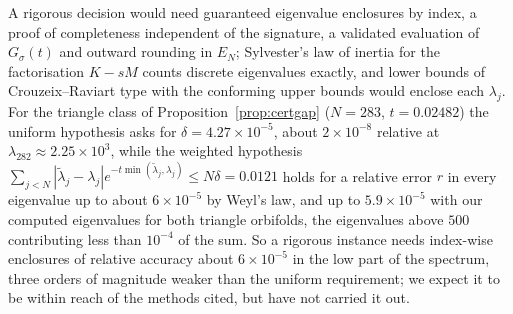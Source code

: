 \documentclass[pdflatex,sn-mathphys-num]{sn-jnl}
\theoremstyle{thmstyleone}%
\theoremstyle{thmstylethree}%
\begin{document}
A rigorous decision would need guaranteed eigenvalue enclosures by index, a proof of completeness independent of the signature, a validated evaluation of $G_\sigma(t)$ and outward rounding in $E_N$; Sylvester's law of inertia for the factorisation $K-sM$ counts discrete eigenvalues exactly, and lower bounds of Crouzeix--Raviart type \cite{liuoishi2013,carstensengedicke2014} with the conforming upper bounds would enclose each $\lambda_j$. For the triangle class of Proposition~\ref{prop:certgap} ($N=283$, $t=0.02482$) the uniform hypothesis asks for $\delta=4.27\times10^{-5}$, about $2\times10^{-8}$ relative at $\lambda_{282}\approx2.25\times10^3$, while the weighted hypothesis $\sum_{j<N}|\tilde\lambda_j-\lambda_j|e^{-t\min(\tilde\lambda_j,\lambda_j)}\le N\delta=0.0121$ holds for a relative error $r$ in every eigenvalue up to about $6\times10^{-5}$ by Weyl's law, and up to $5.9\times10^{-5}$ with our computed eigenvalues for both triangle orbifolds, the eigenvalues above $500$ contributing less than $10^{-4}$ of the sum. So a rigorous instance needs index-wise enclosures of relative accuracy about $6\times10^{-5}$ in the low part of the spectrum, three orders of magnitude weaker than the uniform requirement; we expect it to be within reach of the methods cited, but have not carried it out.
\end{document}
